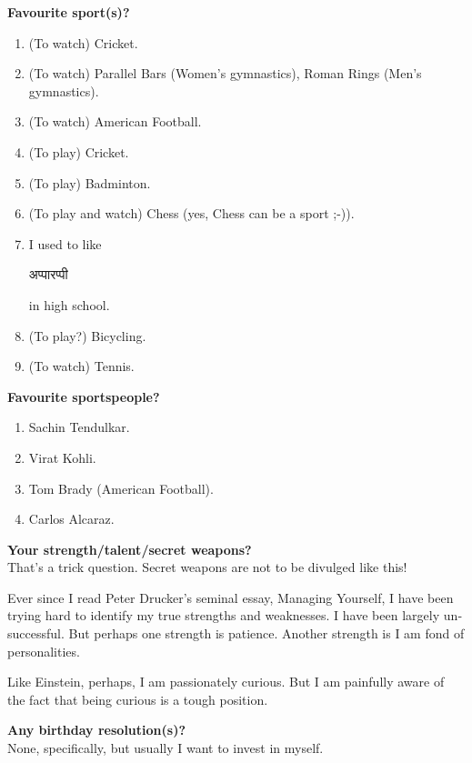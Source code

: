 \documentclass[17pt]{extarticle}  %
\begin{document}
\begin{enumerate}
\begin{english}
\item\textbf{Favourite sport(s)?}\\
\begin{enumerate}
\item (To watch) Cricket.
\item (To watch) Parallel Bars (Women's gymnastics), Roman Rings (Men's gymnastics).
\item (To watch) American Football.
\item (To play) Cricket.
\item (To play) Badminton.
\item (To play and watch) Chess (yes, Chess can be a sport ;-)).
\item I used to like \begin{marathi}अप्पारप्पी\end{marathi} in high school.
\item (To play?) Bicycling.
\item (To watch) Tennis.
\end{enumerate}

\item\textbf{Favourite sportspeople?}\\
\begin{enumerate}
\item Sachin Tendulkar.
\item Virat Kohli.
\item Tom Brady (American Football).
\item Carlos Alcaraz.
\end{enumerate}


\item\textbf{Your strength/talent/secret weapons?}\\

That's a trick question. Secret weapons are not to be divulged like this! 

Ever since I read Peter Drucker's seminal essay, Managing Yourself, I have been trying hard to identify my true strengths and weaknesses. I have been largely unsuccessful. But perhaps one strength is patience. Another strength is I am fond of personalities.

Like Einstein, perhaps, I am passionately curious. But I am painfully aware of the fact that being curious is a tough position.

\item\textbf{Any birthday resolution(s)?}\\

  None, specifically, but usually I want to invest in myself.


\end{english}
\end{enumerate}
\end{document}
